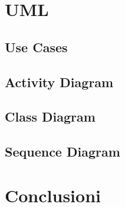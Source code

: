 \documentclass[a4paper]{article}
\begin{document}
\section{UML}
\subsection{Use Cases}

\subsection{Activity Diagram}

\subsection{Class Diagram}

\subsection{Sequence Diagram}

\section{Conclusioni}
\end{document}
